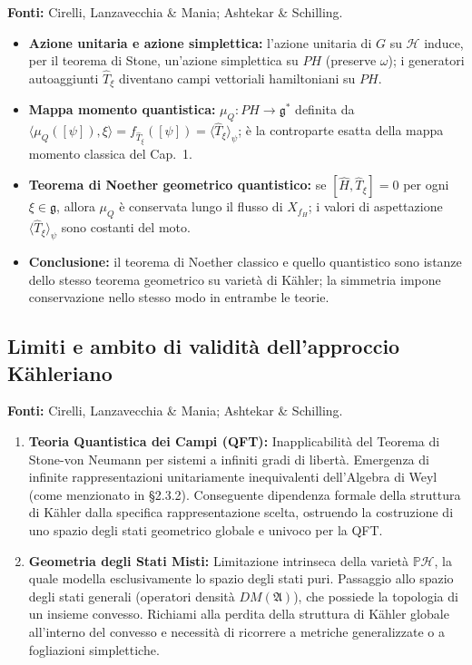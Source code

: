 \documentclass[12pt, a4paper]{article}
\newcommand{\fonti}[1]{%
	\begin{fontebox}
		\textcolor{fontecolor}{\footnotesize\textbf{Fonti:} #1}
	\end{fontebox}%
}
\begin{document}
	\fonti{Cirelli, Lanzavecchia \& Mania; Ashtekar \& Schilling.}
	
	\begin{itemize}
		\item \textbf{Azione unitaria e azione simplettica:} l'azione unitaria di $G$ su $\mathcal{H}$ induce, per il teorema di Stone, un'azione simplettica su $PH$ (preserve $\omega$); i generatori autoaggiunti $\hat{T}_\xi$ diventano campi vettoriali hamiltoniani su $PH$.
		\item \textbf{Mappa momento quantistica:} $\mu_Q: PH \to \mathfrak{g}^*$ definita da $\langle\mu_Q([\psi]), \xi\rangle = f_{\hat{T}_\xi}([\psi]) = \langle\hat{T}_\xi\rangle_\psi$; è la controparte esatta della mappa momento classica del Cap.~1.
		\item \textbf{Teorema di Noether geometrico quantistico:} se $[\hat{H}, \hat{T}_\xi] = 0$ per ogni $\xi \in \mathfrak{g}$, allora $\mu_Q$ è conservata lungo il flusso di $X_{f_H}$; i valori di aspettazione $\langle\hat{T}_\xi\rangle_\psi$ sono costanti del moto.
		\item \textbf{Conclusione:} il teorema di Noether classico e quello quantistico sono istanze dello stesso teorema geometrico su varietà di Kähler; la simmetria impone conservazione nello stesso modo in entrambe le teorie.
	\end{itemize}
	
	\subsection{Limiti e ambito di validità dell'approccio Kähleriano}
	
	\fonti{Cirelli, Lanzavecchia \& Mania; Ashtekar \& Schilling.}
	
	\begin{enumerate}
		\item \textbf{Teoria Quantistica dei Campi (QFT):} Inapplicabilità del Teorema di Stone-von Neumann per sistemi a infiniti gradi di libertà. Emergenza di infinite rappresentazioni unitariamente inequivalenti dell'Algebra di Weyl (come menzionato in \S 2.3.2). Conseguente dipendenza formale della struttura di Kähler dalla specifica rappresentazione scelta, ostruendo la costruzione di uno spazio degli stati geometrico globale e univoco per la QFT.
		
		\item \textbf{Geometria degli Stati Misti:} Limitazione intrinseca della varietà $\mathbb{P}\mathcal{H}$, la quale modella esclusivamente lo spazio degli stati puri. Passaggio allo spazio degli stati generali (operatori densità $DM(\mathfrak{A})$), che possiede la topologia di un insieme convesso. Richiami alla perdita della struttura di Kähler globale all'interno del convesso e necessità di ricorrere a metriche generalizzate o a fogliazioni simplettiche.
	\end{enumerate}
	
\end{document}
